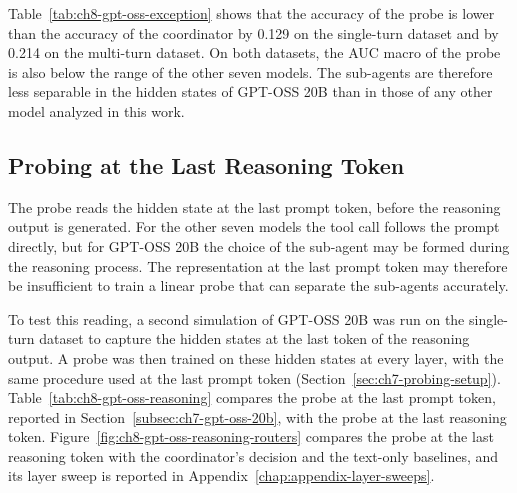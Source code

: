 Table~\ref{tab:ch8-gpt-oss-exception} shows that the accuracy of the probe is lower than the accuracy of the coordinator by 0.129 on the single-turn dataset and by 0.214 on the multi-turn dataset. On both datasets, the AUC macro of the probe is also below the range of the other seven models. The sub-agents are therefore less separable in the hidden states of GPT-OSS 20B than in those of any other model analyzed in this work.

\subsection{Probing at the Last Reasoning Token}
\label{subsec:ch8-gpt-oss-reasoning}

The probe reads the hidden state at the last prompt token, before the reasoning output is generated. For the other seven models the tool call follows the prompt directly, but for GPT-OSS 20B the choice of the sub-agent may be formed during the reasoning process. The representation at the last prompt token may therefore be insufficient to train a linear probe that can separate the sub-agents accurately.

To test this reading, a second simulation of GPT-OSS 20B was run on the single-turn dataset to capture the hidden states at the last token of the reasoning output. A probe was then trained on these hidden states at every layer, with the same procedure used at the last prompt token (Section~\ref{sec:ch7-probing-setup}). Table~\ref{tab:ch8-gpt-oss-reasoning} compares the probe at the last prompt token, reported in Section~\ref{subsec:ch7-gpt-oss-20b}, with the probe at the last reasoning token. Figure~\ref{fig:ch8-gpt-oss-reasoning-routers} compares the probe at the last reasoning token with the coordinator's decision and the text-only baselines, and its layer sweep is reported in Appendix~\ref{chap:appendix-layer-sweeps}.

